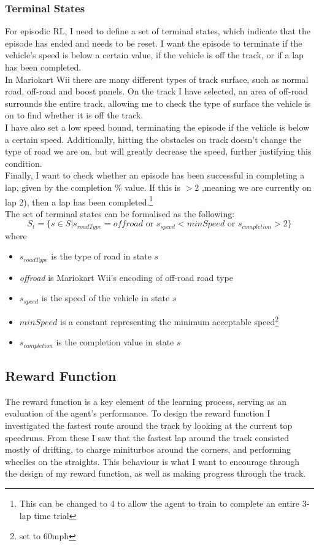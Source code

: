 \subsubsection{Terminal States}
\label{sec:terminal-states}
For episodic RL, I need to define a set of terminal states, which indicate that the episode has ended and needs to be reset. I want the episode to terminate if the vehicle's speed is below a certain value, if the vehicle is off the track, or if a lap has been completed.\\In Mariokart Wii there are many different types of track surface, such as normal road, off-road and boost panels. On the track I have selected, an area of off-road surrounds the entire track, allowing me to check the type of surface the vehicle is on to find whether it is off the track.\\I have also set a low speed bound, terminating the episode if the vehicle is below a certain speed. Additionally, hitting the obstacles on track doesn't change the type of road we are on, but will greatly decrease the speed, further justifying this condition.\\Finally, I want to check whether an episode has been successful in completing a lap, given by the completion \% value. If this is $>2$ ,meaning we are currently on lap 2), then a lap has been completed.\footnote{This can be changed to 4 to allow the agent to train to complete an entire 3-lap time trial} \\The set of terminal states can be formalised as the following:
\[ S_t = \{s \in S | s_{roadType} =  \textit{offroad}\text{ or } s_{speed} < minSpeed \text{ or } s_{completion} >2\}\]
where
\begin{itemize}
    \item $s_{roadType}$ is the type of road in state $s$
    \item \textit{offroad} is Mariokart Wii's encoding of off-road road type
    \item $s_{speed}$ is the speed of the vehicle in state $s$
    \item $minSpeed$ is a constant representing the minimum acceptable speed\footnote{set to 60mph}
    \item $s_{completion}$ is the completion value in state $s$
\end{itemize}
\subsection{Reward Function}
The reward function is a key element of the learning process, serving as an evaluation of the agent's performance. To design the reward function I investigated the fastest route around the track by looking at the current top speedruns. From these I saw that the fastest lap around the track consisted mostly of drifting, to charge miniturbos around the corners, and performing wheelies on the straights. This behaviour is what I want to encourage through the design of my reward function, as well as making progress through the track.
